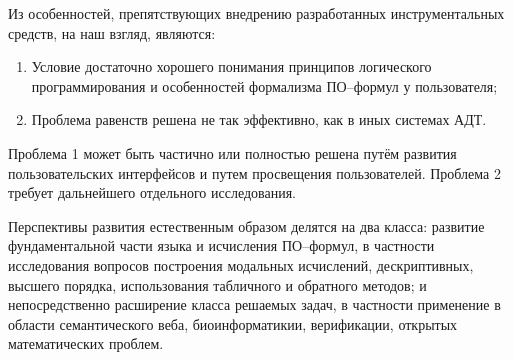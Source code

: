 


Из особенностей, препятствующих внедрению разработанных инструментальных средств, на наш взгляд, являются:

\begin{enumerate}
\item Условие достаточно хорошего понимания принципов логического программирования и особенностей формализма ПО--формул у пользователя;
\item Проблема равенств решена не так эффективно, как в иных системах АДТ.
\end{enumerate}

Проблема 1 может быть частично или полностью решена путём развития пользовательских интерфейсов и путем просвещения пользователей. Проблема 2 требует дальнейшего отдельного исследования.


Перспективы развития естественным образом делятся на два класса: развитие фундаментальной части языка и исчисления ПО--формул, в частности исследования вопросов построения модальных исчислений, дескриптивных, высшего порядка, использования табличного и обратного методов; и непосредственно расширение класса решаемых задач, в частности применение в области семантического веба, биоинформатикии, верификации, открытых математических проблем.



